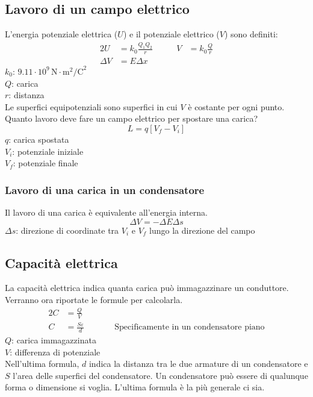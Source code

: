 \subsection{Lavoro di un campo elettrico}
L'energia potenziale elettrica ($U$) e il potenziale elettrico ($V$) sono definiti:
\begin{alignat*}{2}
  U &= k_0\frac{Q_1Q_2}{r} &\qquad V &= k_0\frac{Q}{r}\\
  \Delta V &= E\Delta x &&
\end{alignat*}
\hyperref[tab:k0]{$k_0$}: $9.11\cdot10^9\,\text{N}\cdot\text{m}^2\text{/C}^2$\\
$Q$: carica\\
$r$: distanza\\[\baselineskip]
Le superfici equipotenziali sono superfici in cui $V$ è costante per ogni punto.\\[\baselineskip]
Quanto lavoro deve fare un campo elettrico per spostare una carica?
\begin{equation*}
  L = q\left[V_f - V_i\right]
\end{equation*}
$q$: carica spostata\\
$V_i$: potenziale iniziale\\
$V_f$: potenziale finale

\subsubsection{Lavoro di una carica in un condensatore}
Il lavoro di una carica è equivalente all'energia interna.
\begin{equation*}
  \Delta V = -\Delta E\Delta s
\end{equation*}
$\Delta s$: direzione di coordinate tra $V_i$ e $V_f$ lungo la direzione del campo

\subsection{Capacità elettrica}\label{sub:elettrostatica:capacita}
La capacità elettrica indica quanta carica può immagazzinare un conduttore. Verranno ora 
riportate le formule per calcolarla.
\begin{alignat*}{2}
  C &= \frac{Q}{V} &\qquad &\\
  C &= \frac{S\varepsilon}{d} & &\text{Specificamente in un condensatore piano}
\end{alignat*}
$Q$: carica immagazzinata\\
$V$: differenza di potenziale\\ [\baselineskip]
Nell'ultima formula, $d$ indica la distanza tra le due armature di un condensatore e $S$ l'area 
delle superfici del condensatore. Un condensatore può essere di qualunque forma o dimensione si
voglia. L'ultima formula è la più generale ci sia.

